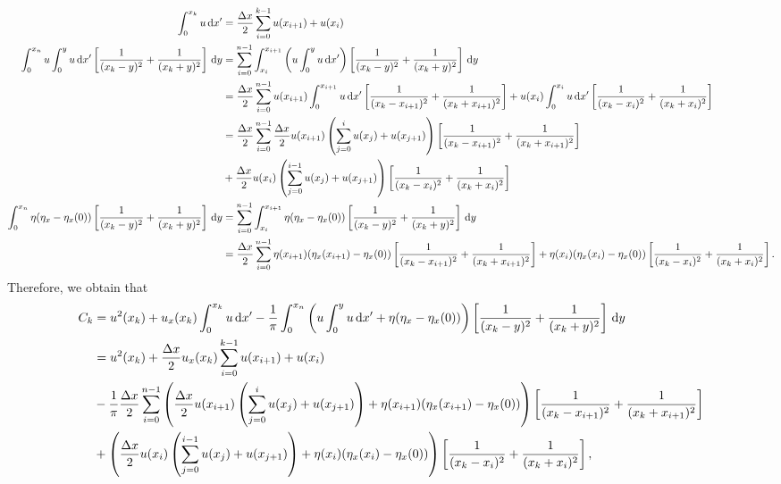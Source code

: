 \documentclass[10pt,reqno,oneside,a4paper, landscape]{article}
\begin{document}
\begin{align*}
\int^{x_k}_{0}u \,\mathrm{d} x' &= \frac{\Delta x}{2} \sum^{k-1}_{i=0} u(x_{i+1}) + u(x_i) \\
\int^{x_n}_0 u\int^y_{0} u\,\mathrm{d} x'  \left[ \frac{1}{(x_k-y)^2} + \frac{1}{(x_k+y)^2} \right] \,\mathrm{d} y &= \sum^{n-1}_{i=0} \int^{x_{i+1}}_{x_i} \left(u\int^y_{0} u\,\mathrm{d} x' \right) \left[ \frac{1}{(x_k-y)^2} + \frac{1}{(x_k+y)^2} \right] \,\mathrm{d} y \\
&= \frac{\Delta x}{2} \sum^{n-1}_{i=0} u(x_{i+1})\int^{x_{i+1}}_{0} u\,\mathrm{d} x'  \left[ \frac{1}{(x_k-x_{i+1})^2} + \frac{1}{(x_k+x_{i+1})^2} \right] + u(x_{i}) \int^{x_{i}}_{0} u\,\mathrm{d} x' \left[ \frac{1}{(x_k-x_{i})^2} + \frac{1}{(x_k+x_{i})^2} \right] \\
&= \frac{\Delta x}{2} \sum^{n-1}_{i=0} \frac{\Delta x}{2} u(x_{i+1}) \left(\sum^{i}_{j=0} u(x_j)+u(x_{j+1}) \right) \left[ \frac{1}{(x_k-x_{i+1})^2} + \frac{1}{(x_k+x_{i+1})^2} \right] \\
&+ \frac{\Delta x}{2}u(x_{i}) \left(\sum^{i-1}_{j=0} u(x_j)+u(x_{j+1}) \right)\left[ \frac{1}{(x_k-x_{i})^2} + \frac{1}{(x_k+x_{i})^2} \right] \\
\int^{x_n}_0 \eta(\eta_x - \eta_x(0)) \left[ \frac{1}{(x_k-y)^2} + \frac{1}{(x_k+y)^2} \right] \,\mathrm{d} y &=  \sum^{n-1}_{i=0} \int^{x_{i+1}}_{x_i}\eta(\eta_x - \eta_x(0)) \left[ \frac{1}{(x_k-y)^2} + \frac{1}{(x_k+y)^2} \right] \,\mathrm{d} y \\
&= \frac{\Delta x}{2} \sum^{n-1}_{i=0} \eta(x_{i+1})(\eta_x(x_{i+1}) - \eta_x(0)) \left[ \frac{1}{(x_k-x_{i+1})^2} + \frac{1}{(x_k+x_{i+1})^2} \right] + \eta(x_{i})(\eta_x(x_{i}) - \eta_x(0)) \left[ \frac{1}{(x_k-x_{i})^2} + \frac{1}{(x_k+x_{i})^2} \right]. 
\end{align*}
Therefore, we obtain that 
\begin{align*}
C_k &= u^2(x_k) + u_{x}(x_k) \int^{x_k}_{0}u \,\mathrm{d} x' - \frac{1}{\pi} \int^{x_n}_0 \left(u\int^y_{0} u\,\mathrm{d} x' + \eta(\eta_x - \eta_x(0))\right) \left[ \frac{1}{(x_k-y)^2} + \frac{1}{(x_k+y)^2} \right] \,\mathrm{d} y \\
&= u^2(x_k) + \frac{\Delta x}{2}  u_{x}(x_k) \sum^{k-1}_{i=0} u(x_{i+1}) + u(x_i) \\
&-\frac{1}{\pi} \frac{\Delta x}{2} \sum^{n-1}_{i=0} \left(\frac{\Delta x}{2} u(x_{i+1}) \left(\sum^{i}_{j=0} u(x_j)+u(x_{j+1}) \right) +\eta(x_{i+1})(\eta_x(x_{i+1}) - \eta_x(0)) \right) \left[ \frac{1}{(x_k-x_{i+1})^2} + \frac{1}{(x_k+x_{i+1})^2} \right] \\
&+ \left( \frac{\Delta x}{2}u(x_{i}) \left(\sum^{i-1}_{j=0} u(x_j)+u(x_{j+1}) \right) + \eta(x_{i})(\eta_x(x_{i}) - \eta_x(0))\right) \left[ \frac{1}{(x_k-x_{i})^2} + \frac{1}{(x_k+x_{i})^2} \right],
\end{align*}
\end{document}
